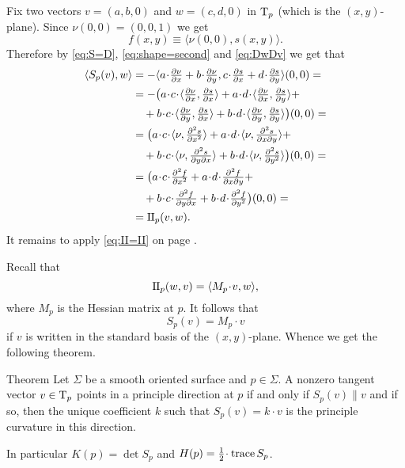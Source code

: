 Fix two vectors $v=(a,b,0)$ and $w=(c,d,0)$ in $\mathrm{T}_p$ (which is the $(x,y)$-plane).
Since $\nu(0,0)=(0,0,1)$ we get 
\[f(x,y)\equiv\langle\nu(0,0),s(x,y)\rangle.\]
Therefore by \ref{eq:S=D}, \ref{eq:shape=second} and \ref{eq:DwDv} we get that 
\begin{align*}
\langle S_p(v),w\rangle 
&=-\langle  a\cdot \tfrac{\partial \nu}{\partial x}+b\cdot \tfrac{\partial \nu}{\partial y},c\cdot \tfrac{\partial s}{\partial x}+d\cdot \tfrac{\partial s}{\partial y}\rangle(0,0)=
\\
&=-\bigl(a\cdot c\cdot\langle \tfrac{\partial \nu}{\partial x},\tfrac{\partial s}{\partial x}\rangle 
+a\cdot d\cdot\langle \tfrac{\partial \nu}{\partial x},\tfrac{\partial s}{\partial y}\rangle+
\\&\quad
+b\cdot c\cdot\langle \tfrac{\partial \nu}{\partial y},\tfrac{\partial s}{\partial x}\rangle
+b\cdot d\cdot\langle \tfrac{\partial \nu}{\partial y},\tfrac{\partial s}{\partial y}\rangle\bigr)(0,0)=
\\
&=\bigl(a\cdot c\cdot\langle \nu,\tfrac{\partial^2 s}{\partial x^2}\rangle 
+a\cdot d\cdot\langle \nu,\tfrac{\partial^2 s}{\partial x\partial y}\rangle+
\\&\quad
+b\cdot c\cdot\langle \nu,\tfrac{\partial^2 s}{\partial y\partial x}\rangle
+b\cdot d\cdot\langle \nu,\tfrac{\partial^2 s}{\partial y^2}\rangle\bigr)(0,0)=
\\
&=\bigl(a\cdot c\cdot\tfrac{\partial^2 f}{\partial x^2} 
+a\cdot d\cdot\tfrac{\partial^2 f}{\partial x\partial y}+
\\&\quad
+b\cdot c\cdot\tfrac{\partial^2 f}{\partial y\partial x}
+b\cdot d\cdot\tfrac{\partial^2 f}{\partial y^2}\bigr)(0,0)=
\\
&=\II_p(v,w).
\end{align*}
It remains to apply \ref{eq:II=II} on page \pageref{eq:II=II}.
\qeds

Recall that 
\[\II_p(w,v)=\langle M_p\cdot v,w\rangle,\]
where $M_p$ is the Hessian matrix at $p$.
It follows that 
\[S_p(v)=M_p\cdot v\]
if $v$ is written in the standard basis of the $(x,y)$-plane.
Whence we get the following theorem. 

\begin{thm}{Theorem}\label{thm:rodrigues}
Let $\Sigma$ be a smooth oriented surface and $p\in \Sigma$.
A nonzero tangent vector $v\in \mathrm{T}_p$ points in a principle direction at $p$
if and only if $S_p(v)\parallel v$ and if so, then the unique coefficient $k$ such that
$S_p(v)=k\cdot v$ is the principle curvature in this direction.

In particular $K(p)=\det S_p$ and $H(p)=\tfrac12\cdot \trace S_p $. %
\end{thm}


